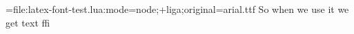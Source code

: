 \documentclass{article}
\begin{document}
\font\testluafont={file:latex-font-test.lua:mode=node;+liga;original=arial.ttf}
{\testluafont So when we use it we get text ffi}

\end{document}
